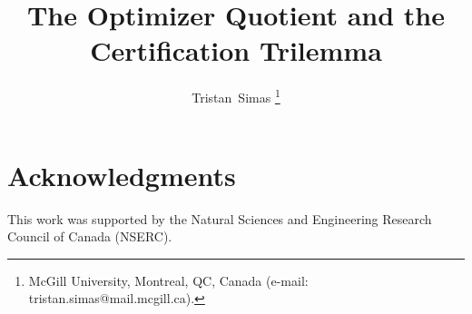 \documentclass[12pt, onecolumn]{IEEEtran}
\title{The Optimizer Quotient and the Certification Trilemma}
\author{Tristan~Simas%
\thanks{McGill University, Montreal, QC, Canada (e-mail: tristan.simas@mail.mcgill.ca).}}
\theoremstyle{leanplain}
\theoremstyle{leandef}
\theoremstyle{leanremark}
\begin{document}
\maketitle

\begin{abstract}

\end{abstract}
















\section*{Acknowledgments}
This work was supported by the Natural Sciences and Engineering Research Council of Canada (NSERC).

\appendix





\end{document}
